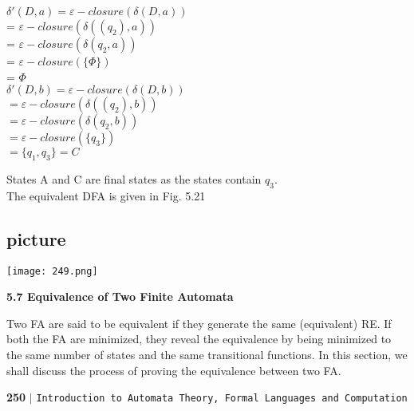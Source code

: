\documentclass{article}
\begin{document}
\begin{center}
 \hspace*{1.7cm}  $\delta'(D, a) = \varepsilon-closure(\delta (D, a))$ \\
\hspace*{3cm} = $\varepsilon-closure (\delta((q_2), a))$ \\
\hspace*{2.5cm} = $\varepsilon-closure (\delta(q_2, a))$ \\
\hspace*{2.3cm} = $\varepsilon-closure (\{\Phi\})$ \\
= $\Phi$ \\


$\delta'(D, b) = \varepsilon-closure(\delta (D, b))$ \\
\hspace*{1.5cm} $= \varepsilon-closure (\delta((q_2), b))$ \\
\hspace*{1cm} $= \varepsilon-closure (\delta(q_2, b))$ \\
\hspace*{0.5cm} $= \varepsilon-closure (\{q_3\})$ \\
$= \{q_1, q_3\} = C$ \\
\end{center}
States A and C are final states as the states contain $q_3$.\\

The equivalent DFA is given in Fig. 5.21\\
\begin{center}
\section{picture}
\texttt{[image: 249.png]}
\end{center}


\large{
\textbf{5.7 Equivalence of Two Finite Automata}
}

\vspace*{0.3cm}
\small{Two FA are said to be equivalent if they generate the same (equivalent) RE. If both the FA are minimized,
they reveal the equivalence by being minimized to the same number of states and the same transitional
functions. In this section, we shall discuss the process of proving the equivalence between two FA.\\}

\newpage
\begin{flushleft}
    \textbf{250}\hspace*{0.1cm} \textbf{$|$} \hspace*{0.1cm} \texttt{Introduction to Automata Theory, Formal Languages and Computation}
  \end{flushleft}
\end{document}
